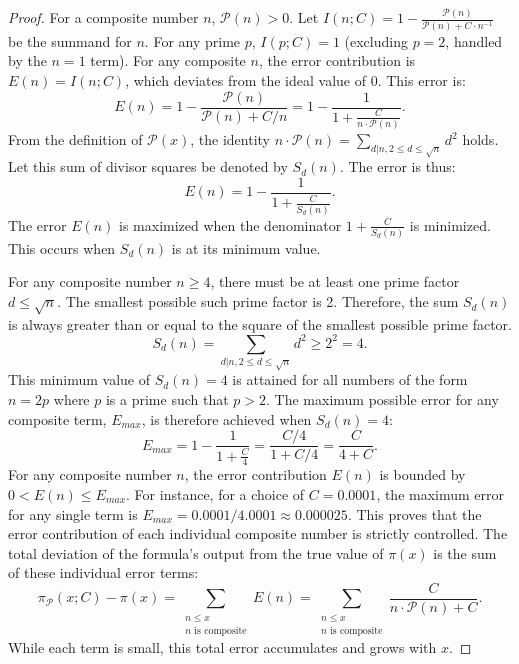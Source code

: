 \documentclass[11pt,a4paper]{amsart}
\newcommand{\Px}{\mathcal{P}}
\theoremstyle{plain}
\theoremstyle{definition}
\begin{document}
\begin{proof}
For a composite number $n$, $\Px(n)>0$. Let $I(n; C) = 1 - \frac{\Px(n)}{\Px(n) + C \cdot n^{-1}}$ be the summand for $n$.
For any prime $p$, $I(p; C) = 1$ (excluding $p=2$, handled by the $n=1$ term).
For any composite $n$, the error contribution is $E(n) = I(n;C)$, which deviates from the ideal value of 0. This error is:
\[ E(n) = 1 - \frac{\Px(n)}{\Px(n) + C/n} = 1 - \frac{1}{1 + \frac{C}{n \cdot \Px(n)}}.
\]
From the definition of $\Px(x)$, the identity $n \cdot \Px(n) = \sum_{d|n, 2\le d \le \sqrt{n}} d^2$ holds.
Let this sum of divisor squares be denoted by $S_d(n)$.
The error is thus:
\[ E(n) = 1 - \frac{1}{1 + \frac{C}{S_d(n)}}.
\]
The error $E(n)$ is maximized when the denominator $1 + \frac{C}{S_d(n)}$ is minimized.
This occurs when $S_d(n)$ is at its minimum value.

For any composite number $n \ge 4$, there must be at least one prime factor $d \le \sqrt{n}$.
The smallest possible such prime factor is 2. Therefore, the sum $S_d(n)$ is always greater than or equal to the square of the smallest possible prime factor.
\[ S_d(n) = \sum_{d|n, 2\le d \le \sqrt{n}} d^2 \ge 2^2 = 4. \]
This minimum value of $S_d(n)=4$ is attained for all numbers of the form $n=2p$ where $p$ is a prime such that $p>2$.
The maximum possible error for any composite term, $E_{max}$, is therefore achieved when $S_d(n)=4$:
\[ E_{max} = 1 - \frac{1}{1 + \frac{C}{4}} = \frac{C/4}{1+C/4} = \frac{C}{4+C}.
\]
For any composite number $n$, the error contribution $E(n)$ is bounded by $0 < E(n) \le E_{max}$.
For instance, for a choice of $C=0.0001$, the maximum error for any single term is $E_{max} = 0.0001 / 4.0001 \approx 0.000025$.
This proves that the error contribution of each individual composite number is strictly controlled.
The total deviation of the formula's output from the true value of $\pi(x)$ is the sum of these individual error terms:
\[ \pi_\Px(x; C) - \pi(x) = \sum_{\substack{n \le x \\ n \text{ is composite}}} E(n) = \sum_{\substack{n \le x \\ n \text{ is composite}}} \frac{C}{n \cdot \Px(n) + C}.
\]
While each term is small, this total error accumulates and grows with $x$.
\end{proof}
\end{document}
